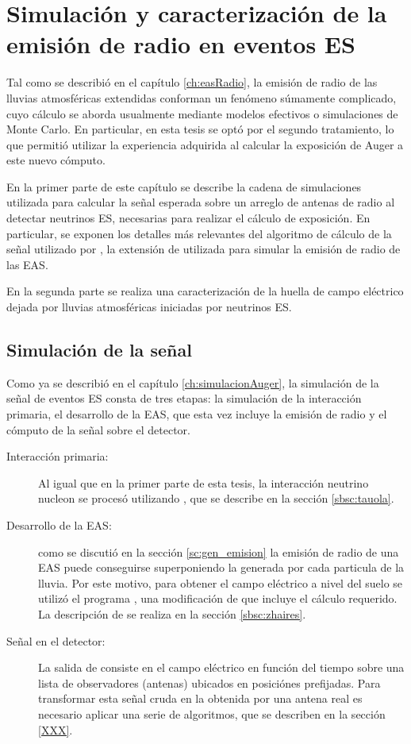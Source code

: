 \chapter{Simulaci\'on y caracterizaci\'on de la emisi\'on de radio en eventos ES}
\label{ch:simulacionRadio}

Tal como se describi\'o en el cap\'itulo \ref{ch:easRadio}, la emisi\'on de radio de las lluvias atmosf\'ericas extendidas conforman un fen\'omeno s\'umamente complicado, cuyo c\'alculo se aborda usualmente mediante modelos efectivos o simulaciones de Monte Carlo.
En particular, en esta tesis se opt\'o por el segundo tratamiento, lo que permiti\'o utilizar la experiencia adquirida al calcular la exposici\'on de Auger a este nuevo c\'omputo.

En la primer parte de este cap\'itulo se describe la cadena de simulaciones utilizada para calcular la se\~nal esperada sobre un arreglo de antenas de radio al detectar neutrinos ES, necesarias para realizar el c\'alculo de exposici\'on.
En particular, se exponen los detalles m\'as relevantes del algoritmo de c\'alculo de la se\~nal utilizado por \zhs{}, la extensi\'on de \aires{} utilizada para simular la emisi\'on de radio de las EAS.

En la segunda parte se realiza una caracterizaci\'on de la huella de campo el\'ectrico dejada por lluvias atmosf\'ericas iniciadas por neutrinos ES.

\section{Simulaci\'on de la se\~nal}
\label{sc:simRadio}
	
	Como ya se describi\'o en el cap\'itulo \ref{ch:simulacionAuger}, la simulaci\'on de la se\~nal de eventos ES consta de tres etapas: la simulaci\'on de la interacci\'on primaria, el desarrollo de la EAS, que esta vez incluye la emisi\'on de radio y el c\'omputo de la se\~nal sobre el detector.
	\begin{description}
	\item[Interacción primaria:] Al igual que en la primer parte de esta tesis, la interacci\'on neutrino nucleon se proces\'o utilizando \tauola{}, que se describe en la secci\'on \ref{sbsc:tauola}.
	\item[Desarrollo de la EAS:] como se discuti\'o en la secci\'on \ref{sc:gen_emision} la emisi\'on de radio de una EAS puede conseguirse superponiendo la generada por cada particula de la lluvia. Por este motivo, para obtener el campo el\'ectrico a nivel del suelo se utiliz\'o el programa \zhs{}, una modificaci\'on de \aires{} que incluye el c\'alculo requerido. La descripci\'on de \zhs{} se realiza en la secci\'on \ref{sbsc:zhaires}.
	\item[Señal en el detector:] La salida de \zhs{} consiste en el campo el\'ectrico en funci\'on del tiempo sobre una lista de observadores (antenas) ubicados en posici\'ones prefijadas. Para transformar esta se\~nal cruda en la obtenida por una antena real es necesario aplicar una serie de algoritmos, que se describen en la secci\'on \ref{XXX}.
	\end{description}
	
